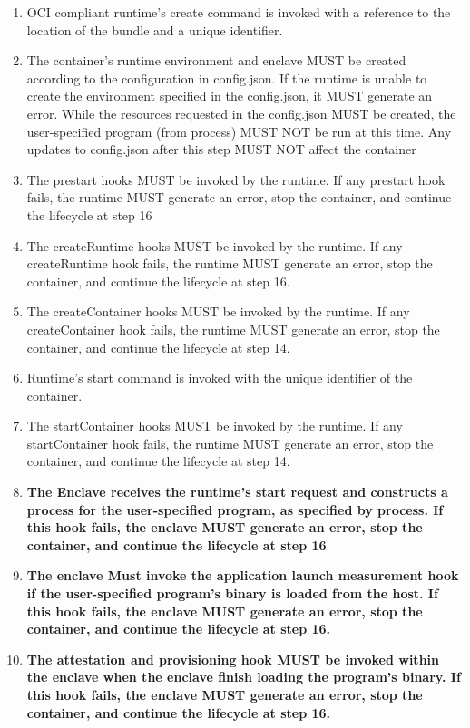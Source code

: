 \begin{enumerate}
    \item OCI compliant runtime's create command is invoked with a reference to the location of the bundle and a unique identifier.
    \item The container's runtime environment and enclave MUST be created according to the configuration in config.json. If the runtime is unable to create the environment specified in the config.json, it MUST generate an error. While the resources requested in the config.json MUST be created, the user-specified program (from process) MUST NOT be run at this time. Any updates to config.json after this step MUST NOT affect the container
    \item The prestart hooks MUST be invoked by the runtime. If any prestart hook fails, the runtime MUST generate an error, stop the container, and continue the lifecycle at step 16
    \item The createRuntime hooks MUST be invoked by the runtime. If any createRuntime hook fails, the runtime MUST generate an error, stop the container, and continue the lifecycle at step 16.
    \item The createContainer hooks MUST be invoked by the runtime. If any createContainer hook fails, the runtime MUST generate an error, stop the container, and continue the lifecycle at step 14.
    \item Runtime's start command is invoked with the unique identifier of the container.
    \item The startContainer hooks MUST be invoked by the runtime. If any startContainer hook fails, the runtime MUST generate an error, stop the container, and continue the lifecycle at step 14.
    \item \textbf{The Enclave receives the runtime’s start request and constructs a process for the user-specified program, as specified by process. If this hook fails, the enclave MUST generate an error, stop the container, and continue the lifecycle at step 16}
    \item \textbf{The enclave Must invoke the application launch measurement hook if the user-specified program’s binary is loaded from the host. If this hook fails, the enclave MUST generate an error, stop the container, and continue the lifecycle at step 16.}
    \item \textbf{The attestation and provisioning hook MUST be invoked within the enclave when the enclave finish loading the program’s binary. If this hook fails, the enclave MUST generate an error, stop the container, and continue the lifecycle at step 16.}

\end{enumerate}
